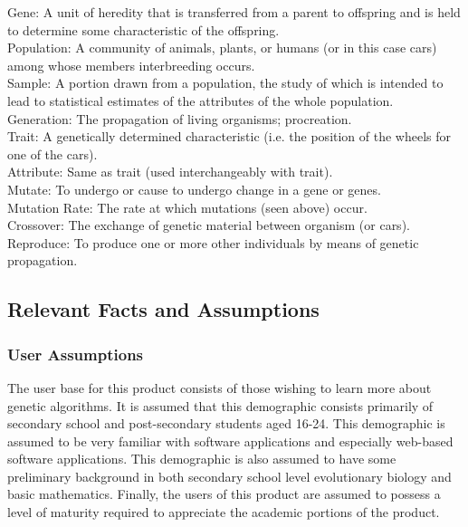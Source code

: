 \documentclass[12pt, titlepage]{article}
\begin{document}
Gene: A unit of heredity that is transferred from a parent to offspring and is held to determine some characteristic of the offspring.\\

Population: A community of animals, plants, or humans (or in this case cars) among whose members interbreeding occurs.\\

Sample: A portion drawn from a population, the study of which is intended to lead to statistical estimates of the attributes of the whole population.\\

Generation: The propagation of living organisms; procreation.\\

Trait: A genetically determined characteristic (i.e. the position of the wheels for one of the cars).\\

Attribute: Same as trait (used interchangeably with trait).\\

Mutate: To undergo or cause to undergo change in a gene or genes.\\

Mutation Rate: The rate at which mutations (seen above) occur.\\

Crossover: The exchange of genetic material between organism (or cars).\\

Reproduce: To produce one or more other individuals by means of genetic propagation.\\

\subsection{Relevant Facts and Assumptions}

\subsubsection{User Assumptions}

The user base for this product consists of those wishing to learn more about genetic algorithms. It is assumed that this demographic consists primarily of secondary school and post-secondary students aged 16-24. This demographic is assumed to be very familiar with software applications and especially web-based software applications. This demographic is also assumed to have some preliminary background in both secondary school level evolutionary biology and basic mathematics. Finally, the users of this product are assumed to possess a level of maturity required to appreciate the academic portions of the product.
\end{document}
